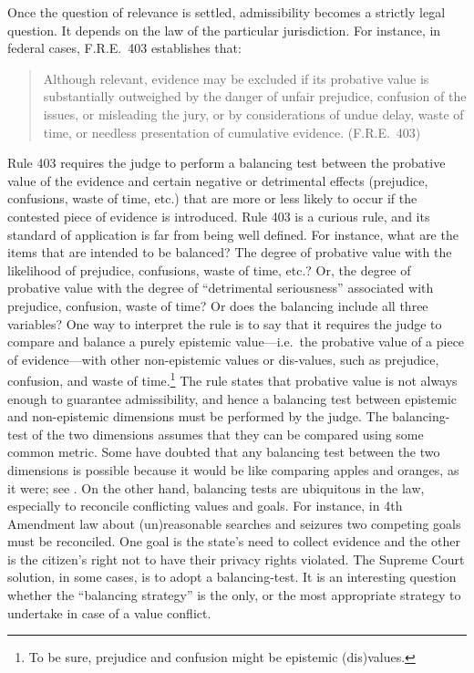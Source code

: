 \documentclass[10pt]{article}
\begin{document}
Once the question of relevance is settled, admissibility becomes a strictly legal question. It depends on the law of the particular jurisdiction. 
For instance, in federal cases, F.R.E.\ 403 establishes that:
%
\begin{quote}
\begin{singlespace}
Although relevant, evidence may be excluded if its probative value is substantially outweighed by the danger of unfair prejudice, confusion of the issues, or misleading the jury, or by considerations of undue delay, waste of time, or needless presentation of cumulative evidence. (F.R.E.\ 403)
\end{singlespace}
\end{quote}
%
Rule 403 requires the judge to perform a balancing test between the probative value of the evidence 
and certain negative or detrimental effects (prejudice, confusions, waste of time, etc.) that 
are more or less likely to occur if the contested piece of evidence is introduced.
Rule 403 is a curious rule, and its standard of application is far from being 
well defined. For instance, what are the items that are intended to be balanced? 
The degree of probative value with the likelihood of prejudice, confusions, waste of time, etc.? 
Or, the degree of probative value with the degree of ``detrimental seriousness''
associated with prejudice, confusion, waste of time? Or does the balancing 
include all three variables? One way to interpret the rule is to say that it requires the judge to compare and balance a purely 
epistemic value---i.e.\ the probative value of a piece of evidence---with other non-epistemic values or dis-values, 
such as prejudice, confusion, and waste of time.\footnote{To be sure, prejudice and confusion might be epistemic (dis)values.} 
The rule states that probative value is not always enough to guarantee admissibility, and hence a balancing test between epistemic and non-epistemic dimensions 
must be performed by the judge. The balancing-test of the two dimensions assumes that they 
can be compared using some common metric. Some have doubted that any balancing test between the two dimensions is possible because it 
would be like comparing apples and oranges, as it were; see \cite{taruffo09}. On the other hand, balancing tests are ubiquitous in the law, especially to reconcile conflicting values and goals. For instance, in 4th Amendment law about (un)reasonable 
searches and seizures two competing goals must be reconciled. One goal is the state's need to collect evidence and the other is the citizen's right not to have their privacy rights violated. The Supreme Court solution, in some cases, is to adopt a balancing-test. It is an interesting question 
whether the ``balancing strategy'' is the only, or the most appropriate strategy to undertake in case of a value conflict.
\end{document}
